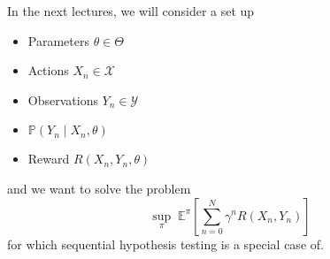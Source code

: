 \documentclass[pdftex,letterpaper,11pt]{article}
\theoremstyle{definition}
\theoremstyle{definition}
\theoremstyle{definition}
\newcommand{\PP}{\mathbb P}
\newcommand{\EE}{\mathbb E}
\newcommand{\mc}[1]{\mathcal{#1}}
\begin{document}
In the next lectures, we will consider a set up
\begin{itemize}
	\item Parameters $\theta \in \Theta$
	\item Actions $X_n \in \mc X$
	\item Observations $Y_n \in \mc Y$
	\item $\PP(Y_n \mid X_n, \theta)$
	\item Reward $R(X_n, Y_n, \theta)$
\end{itemize}
and we want to solve the problem
\[\sup_\pi \; \EE^\pi\left[\sum_{n=0}^N \gamma^n R(X_n, Y_n)\right]\]
for which sequential hypothesis testing is a special case of.
\end{document}
